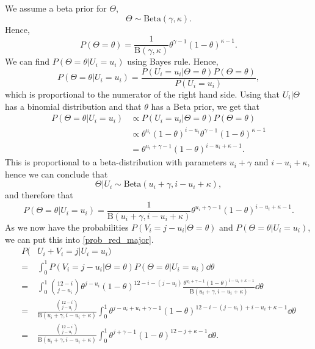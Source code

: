 We assume a beta prior for $\Theta$,
\begin{equation*}
    \Theta \sim \text{Beta}(\gamma,\kappa).
\end{equation*}
Hence,
\begin{equation*}
    P(\Theta=\theta) = \frac{1}{\text{B}(\gamma,\kappa)}\theta^{\gamma-1}(1-\theta)^{\kappa-1}.
\end{equation*}
We can find $P(\Theta=\theta| U_i=u_i)$ using Bayes rule. Hence,
\begin{equation*}
    P(\Theta=\theta| U_i=u_i) = \frac{P(U_i=u_i|\Theta=\theta)P(\Theta=\theta)}{P(U_i=u_i)},
\end{equation*}
which is proportional to the numerator of the right hand side. Using that $U_i|\Theta$ has a binomial distribution and that $\theta$ has a Beta prior, we get that
\begin{equation*}
    \begin{aligned}
        P(\Theta=\theta|U_i=u_i) 
        &\propto P(U_i=u_i|\Theta=\theta)P(\Theta=\theta)\\[6pt] 
        &\propto \theta^{u_i}(1-\theta)^{i-u_i}\theta^{\gamma-1}(1-\theta)^{\kappa-1}\\[6pt]
        &= \theta^{u_i+\gamma-1}(1-\theta)^{i-u_i+\kappa-1}.
    \end{aligned}
\end{equation*}
This is proportional to a beta-distribution with parameters $u_i+\gamma$ and $i-u_i+\kappa$, hence we can conclude that
\begin{equation*}
    \Theta|U_i \sim \text{Beta}(u_i+\gamma,i-u_i+\kappa),
\end{equation*}
and therefore that 
\begin{equation}
\label{p_given_ui}
    P(\Theta=\theta|U_i=u_i) = \frac{1}{\text{B}(u_i+\gamma,i-u_i+\kappa)}\theta^{u_i+\gamma-1}(1-\theta)^{i-u_i+\kappa-1}.
\end{equation}
As we now have the probabilities $P(V_i=j-u_i|\Theta=\theta)$ and $P(\Theta=\theta|U_i=u_i)$, we can put this into \eqref{prob_red_major}.
\begin{equation}
\label{red_12_equal_j}
    \begin{aligned}
         P(&U_i+V_i = j | U_i=u_i) \\[6pt]
        =& \int_0^1 P(V_i = j-u_i | \Theta=\theta) P(\Theta=\theta| U_i=u_i) \dd \theta \\[6pt]
        =& \int_0^1 \binom{12-i}{j-u_i}\theta^{j-u_i}(1-\theta)^{12-i-(j-u_i)} \frac{\theta^{u_i+\gamma-1}(1-\theta)^{i-u_i+\kappa-1}}{\text{B}(u_i+\gamma,i-u_i+\kappa)} \dd \theta\\[6pt]
        =& \frac{\binom{12-i}{j-u_i}}{\text{B}(u_i+\gamma,i-u_i+\kappa)} \int_0^1 
        \theta^{j-u_i+u_i+\gamma-1}(1-\theta)^{12-i-(j-u_i)+i-u_i+\kappa-1} \dd \theta\\[6pt]
        =& \frac{\binom{12-i}{j-u_i}}{\text{B}(u_i+\gamma,i-u_i+\kappa)} \int_0^1 
        \theta^{j+\gamma-1}(1-\theta)^{12-j+\kappa-1} \dd \theta.
    \end{aligned}
\end{equation}
